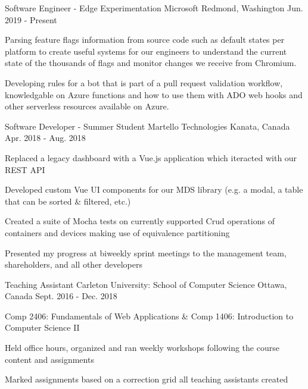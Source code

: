
\begin{cventries}
	\cventry
		{Software Engineer - Edge Experimentation}
		{Microsoft}
		{Redmond, Washington}
		{Jun. 2019 - Present}
		{\begin{cvitems}
			\item Parsing feature flags information from source code such as default states per platform to create useful systems for our engineers to understand the current state of the thousands of flags and monitor changes we receive from Chromium.
			\item Developing rules for a bot that is part of a pull request validation workflow, knowledgable on Azure functions and how to use them with ADO web hooks and other serverless resources available on Azure.
		\end{cvitems}}

	\cventry
		{Software Developer - Summer Student}
		{Martello Technologies}
		{Kanata, Canada}
		{Apr. 2018 - Aug. 2018}
		{\begin{cvitems}
			\item Replaced a legacy dashboard with a Vue.js application which iteracted with our REST API
			\item Developed custom Vue UI components for our MDS library (e.g. a modal, a table that can be sorted \& filtered, etc.)
			\item Created a suite of Mocha tests on currently supported Crud operations of containers and devices making use of equivalence partitioning
			\item Presented my progress at biweekly sprint meetings to the management team, shareholders, and all other developers
		\end{cvitems}}

	\cventry
		{Teaching Assistant}
		{Carleton University: School of Computer Science}
		{Ottawa, Canada}
		{Sept. 2016 - Dec. 2018}
		{\begin{cvitems}
			\item Comp 2406: Fundamentals of Web Applications \& Comp 1406: Introduction to Computer Science II
			\item Held office hours, organized and ran weekly workshops following the course content and assignments
			\item Marked assignments based on a correction grid all teaching assistants created
		\end{cvitems}}
\end{cventries}